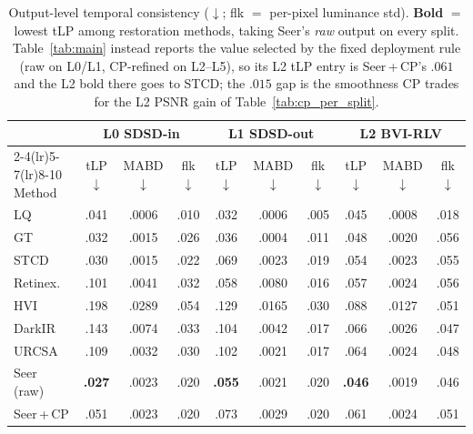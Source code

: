 \begin{table}[h]
\centering\scriptsize\setlength{\tabcolsep}{1.8pt}
\begin{tabular}{l ccc ccc ccc}
\toprule
& \multicolumn{3}{c}{\textbf{L0} SDSD-in} & \multicolumn{3}{c}{\textbf{L1} SDSD-out} & \multicolumn{3}{c}{\textbf{L2} BVI-RLV} \\
\cmidrule(lr){2-4}\cmidrule(lr){5-7}\cmidrule(lr){8-10}
Method & tLP$\downarrow$ & MABD$\downarrow$ & flk$\downarrow$ & tLP$\downarrow$ & MABD$\downarrow$ & flk$\downarrow$ & tLP$\downarrow$ & MABD$\downarrow$ & flk$\downarrow$ \\
\midrule
LQ            & .041 & .0006 & .010 & .032 & .0006 & .005 & .045 & .0008 & .018 \\
GT            & .032 & .0015 & .026 & .036 & .0004 & .011 & .048 & .0020 & .056 \\
\midrule
STCD          & .030 & .0015 & .022 & .069 & .0023 & .019 & .054 & .0023 & .055 \\
Retinex.      & .101 & .0041 & .032 & .058 & .0080 & .016 & .057 & .0024 & .056 \\
HVI           & .198 & .0289 & .054 & .129 & .0165 & .030 & .088 & .0127 & .051 \\
DarkIR        & .143 & .0074 & .033 & .104 & .0042 & .017 & .066 & .0026 & .047 \\
URCSA         & .109 & .0032 & .030 & .102 & .0021 & .017 & .064 & .0024 & .048 \\
\rowcolor{gray!8}
Seer (raw)    & \textbf{.027} & .0023 & .020 & \textbf{.055} & .0021 & .020 & \textbf{.046} & .0019 & .046 \\
\rowcolor{gray!8}
Seer\,+\,CP   & .051 & .0023 & .020 & .073 & .0029 & .020 & .061 & .0024 & .051 \\%
\bottomrule
\end{tabular}
\caption{Output-level temporal consistency ($\downarrow$; flk $=$ per-pixel luminance std). \textbf{Bold} $=$ lowest tLP among restoration methods, taking Seer's \emph{raw} output on every split. Table~\ref{tab:main} instead reports the value selected by the fixed deployment rule (raw on L0/L1, CP-refined on L2--L5), so its L2 tLP entry is Seer\,+\,CP's $.061$ and the L2 bold there goes to STCD; the $.015$ gap is the smoothness CP trades for the L2 PSNR gain of Table~\ref{tab:cp_per_split}.}
\label{tab:temporal}
\end{table}


